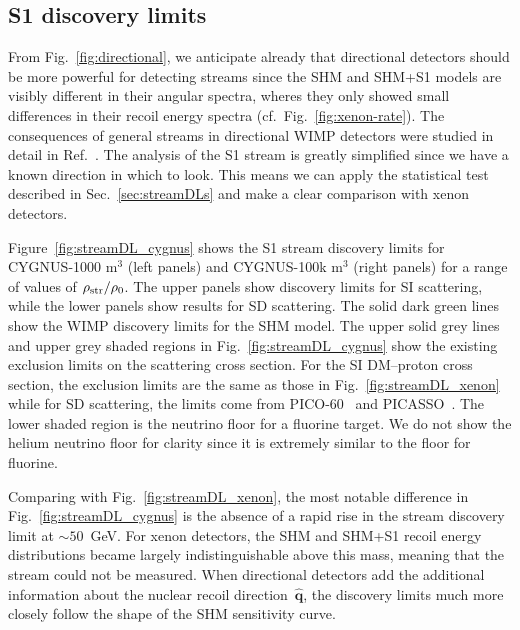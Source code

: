 \documentclass[prd,10pt,twocolumn,showpacs,nofootinbib,aps,superscriptaddress,preprintnumbers]{revtex4-1}
\begin{document}
\subsection{S1 discovery limits}

From Fig.~\ref{fig:directional}, we anticipate already that directional detectors should be more powerful for detecting streams since the SHM and SHM+S1 models are visibly different in their angular spectra, wheres they only showed small differences in their recoil energy spectra (cf.\ Fig.~\ref{fig:xenon-rate}).
The consequences of general streams in directional WIMP detectors were studied in detail in Ref.~\cite{O'Hare:2014oxa}.
The analysis of the S1 stream is greatly simplified since we have a known direction in which to look. 
This means we can apply the statistical test described in Sec.~\ref{sec:streamDLs} and make a clear comparison with xenon detectors. 

Figure~\ref{fig:streamDL_cygnus} shows the S1 stream discovery limits for CYGNUS-1000 m$^3$ (left panels) and CYGNUS-100k m$^3$ (right panels)
for a range of values of $\rho_{\rm{str}}/\rho_0$.
The upper panels show discovery limits for SI scattering, while the lower panels show results for SD scattering.
The solid dark green lines show the WIMP discovery limits for the SHM model. 
The upper solid grey lines and upper grey shaded regions in Fig.~\ref{fig:streamDL_cygnus} show
the existing exclusion limits on the scattering cross section.
For the SI DM--proton cross section, the exclusion limits are the same as those in Fig.~\ref{fig:streamDL_xenon}
while for SD scattering, the limits come from PICO-60~\cite{Amole:2015pla} and PICASSO~\cite{Archambault:2012pm}.
The lower shaded region is the neutrino floor for a fluorine target. We do not show the helium neutrino floor for clarity since it is extremely similar to the floor for fluorine.

Comparing with Fig.~\ref{fig:streamDL_xenon}, the most notable difference in Fig.~\ref{fig:streamDL_cygnus} 
is the absence of a rapid rise in the stream discovery limit
at $\sim50$~GeV. For xenon detectors, the SHM and SHM+S1 recoil energy distributions 
became largely indistinguishable above this mass, meaning that the stream could not be measured.
When directional detectors add the additional information about the nuclear recoil direction~$\hat{\textbf{q}}$,
the discovery limits much more closely follow the shape of the SHM sensitivity curve.
\end{document}

